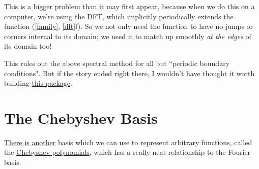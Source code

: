 \documentclass[10pt]{article}
\begin{document}
This is a bigger problem than it may first appear, because when we do this on a computer, we're using the DFT, which implicitly periodically extends the function (\autoref{family}, \autoref{dft}f). So we not only need the function to have no jumps or corners internal to its domain; we need it to match up smoothly \textit{at the edges} of its domain too!

This rules out the above spectral method for all but ``periodic boundary conditions"\cite{kutz}. But if the story ended right there, I wouldn't have thought it worth building \href{https://pypi.org/project/spectral-derivatives/}{this package}.

\section{The Chebyshev Basis}

\href{https://www.youtube.com/watch?v=HloOBYPwlmU}{There is another} basis which we can use to represent arbitrary functions, called the \href{https://epubs.siam.org/doi/epdf/10.1137/1.9780898719598.ch8}{Chebyshev polynomials}\cite{trefethen8}, which has a really neat relationship to the Fourier basis.
\end{document}
